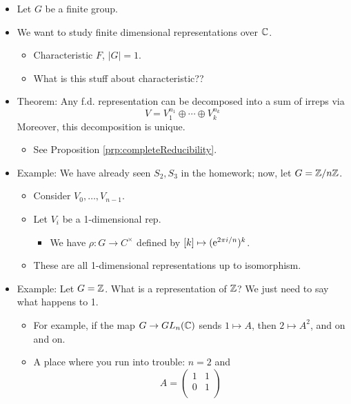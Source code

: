 \documentclass[../notes.tex]{subfiles}
\begin{document}
\begin{itemize}
    \item {}Let $G$ be a finite group.
    \item We want to study finite dimensional representations over $\C$.
    \begin{itemize}
        \item Characteristic $F$, $|G|=1$.
        \item What is this stuff about characteristic??
    \end{itemize}
    \item Theorem: Any f.d. representation can be decomposed into a sum of irreps via
    \begin{equation*}
        V = V_1^{n_1}\oplus\cdots\oplus V_k^{n_k}
    \end{equation*}
    Moreover, this decomposition is unique.
    \begin{itemize}
        \item See Proposition \ref{prp:completeReducibility}.
    \end{itemize}
    \item Example: We have already seen $S_2,S_3$ in the homework; now, let $G=\Z/n\Z$.
    \begin{itemize}
        \item Consider $V_0,\dots,V_{n-1}$.
        \item Let $V_i$ be a 1-dimensional rep.
        \begin{itemize}
            \item We have $\rho:G\to C^\times$ defined by $[k]\mapsto(\e[2\pi i/n])^k$.
        \end{itemize}
        \item These are all 1-dimensional representations up to isomorphism.
    \end{itemize}
    \item Example: Let $G=\Z$. What is a representation of $\Z$? We just need to say what happens to 1.
    \begin{itemize}
        \item For example, if the map $G\to GL_n(\C)$ sends $1\mapsto A$, then $2\mapsto A^2$, and on and on.
        \item A place where you run into trouble: $n=2$ and
        \begin{equation*}
            A =
            \begin{pmatrix}
                1 & 1\\
                0 & 1\\

\end{pmatrix}
\end{equation*}
\end{itemize}
\end{itemize}
\end{document}
